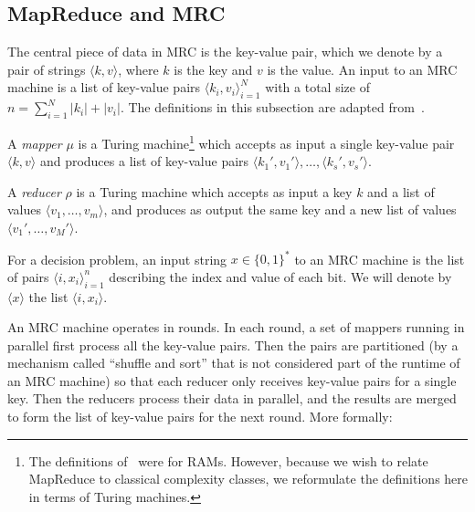 \documentclass{llncs}
\begin{document}
\subsection{MapReduce and MRC}

The central piece of data in MRC is the key-value pair, which we denote by a
pair of strings $\langle k, v \rangle$, where $k$ is the key and $v$ is the
value. An input to an MRC machine is a list of key-value pairs $\langle k_i,
v_i \rangle_{i=1}^N$ with a total size of $n = \sum_{i=1}^N |k_i| + |v_i|$.
The definitions in this subsection are adapted from~\cite{Karloff10}.

\begin{definition}
A \emph{mapper} $\mu$ is a Turing machine\footnote{The definitions
of~\cite{Karloff10} were for RAMs. However, because we wish to relate MapReduce
to classical complexity classes, we reformulate the definitions here in terms
of Turing machines.} which accepts as input a single key-value pair $\langle k,
v \rangle$ and produces a list of key-value pairs $\langle k_1', v_1' \rangle,
\dots, \langle k_s', v_s' \rangle$. \end{definition}

\begin{definition}
A \emph{reducer} $\rho$ is a Turing machine which accepts as input a key $k$
and a list of values $\langle v_1 , \dots, v_m \rangle$, and produces as output
the same key and a new list of values $\langle v_1', \dots, v_M' \rangle$.
\end{definition}

\begin{definition}
For a decision problem, an input string $x \in \{ 0,1 \}^*$ to an MRC machine
is the list of pairs $\langle i, x_i \rangle_{i=1}^n$ describing the index
and value of each bit. We will denote by $\langle x \rangle$ the list $\langle
i, x_i \rangle$.
\end{definition}

An MRC machine operates in rounds. In each round, a set of mappers running in
parallel first process all the key-value pairs. Then the pairs are partitioned
(by a mechanism called ``shuffle and sort'' that is not considered part of the
runtime of an MRC machine) so that each reducer only receives key-value pairs
for a single key. Then the reducers process their data in parallel, and the
results are merged to form the list of key-value pairs for the next round. More
formally:
\end{document}
